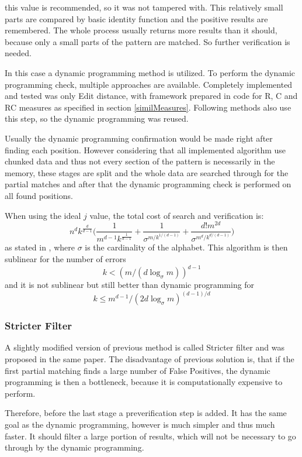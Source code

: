 this value is recommended, so it was not tampered with. This relatively small parts are compared by basic identity function and the positive results are remembered. The whole process usually returns more results than it should, because only a small parts of the pattern are matched. So further verification is needed.

In this case a dynamic programming method is utilized. To perform the dynamic programming check, multiple approaches are available. Completely implemented and tested was only Edit distance, with framework prepared in code for R, C and RC measures as specified in section \ref{similMeasures}. Following methods also use this step, so the dynamic programming was reused.

Usually the dynamic programming confirmation would be made right after finding each position. However considering that all implemented algorithm use chunked data and thus not every section of the pattern is necessarily in the memory, these stages are split and the whole data are searched through for the partial matches and after that the dynamic programming check is performed on all found positions.

When using the ideal $j$ value, the total cost of search and verification is: $$n^dk^{\frac{d}{d-1}}\Big(\frac{1}{m^{d-1}k^{\frac{1}{d-1}}} + \frac{1}{\sigma^{m/k^{1/(d-1)}}} + \frac{d!m^{2d}}{\sigma^{m^d/k^{d/(d-1)}}}\Big)$$ as stated in \cite{mdApproxPM}, where $\sigma$ is the cardinality of the alphabet. This algorithm is then sublinear for the number of errors $$ k < (m/(d \log_\sigma m))^{d-1} $$ and it is not sublinear but still better than dynamic programming for $$k \leq m^{d-1}/(2d\log_\sigma m)^{(d-1)/d} $$

\subsubsection{Stricter Filter}
A slightly modified version of previous method is called Stricter filter and was proposed in the same paper. The disadvantage of previous solution is, that if the first partial matching finds a large number of False Positives, the dynamic programming is then a bottleneck, because it is computationally expensive to perform.

Therefore, before the last stage a preverification step is added. It has the same goal as the dynamic programming, however is much simpler and thus much faster. It should filter a large portion of results, which will not be necessary to go through by the dynamic programming.

